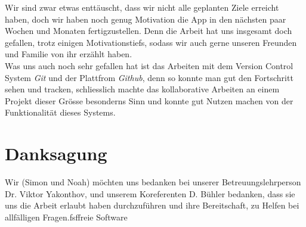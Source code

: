 \documentclass[a4paper,11pt]{article}
\begin{document}
Wir sind zwar etwas enttäuscht, dass wir nicht alle geplanten Ziele erreicht haben, doch wir haben noch genug Motivation die App in den nächsten paar Wochen und Monaten fertigzustellen. Denn die Arbeit hat uns insgesamt doch gefallen, trotz einigen Motivationstiefs, sodass wir auch gerne unseren Freunden und Familie von ihr erzählt haben.\\

Was uns auch noch sehr gefallen hat ist das Arbeiten mit dem Version Control System \textit{Git} und der Plattfrom \textit{Github}, denn so konnte man gut den Fortschritt sehen und tracken, schliesslich machte das kollaborative Arbeiten an einem Projekt dieser Grösse besonderns Sinn und konnte gut Nutzen machen von der Funktionalität dieses Systems.

\section{Danksagung}
Wir (Simon und Noah) möchten uns bedanken bei unserer Betreuungslehrperson Dr. Viktor Yakonthov, und unserem Koreferenten D. Bühler bedanken, dass sie uns die Arbeit erlaubt haben durchzuführen und ihre Bereitschaft, zu Helfen bei allfälligen Fragen.\gls{fsf}\gls{freie Software}

\clearpage
\printglossary

\newpage
\printbibliography
\end{document}
